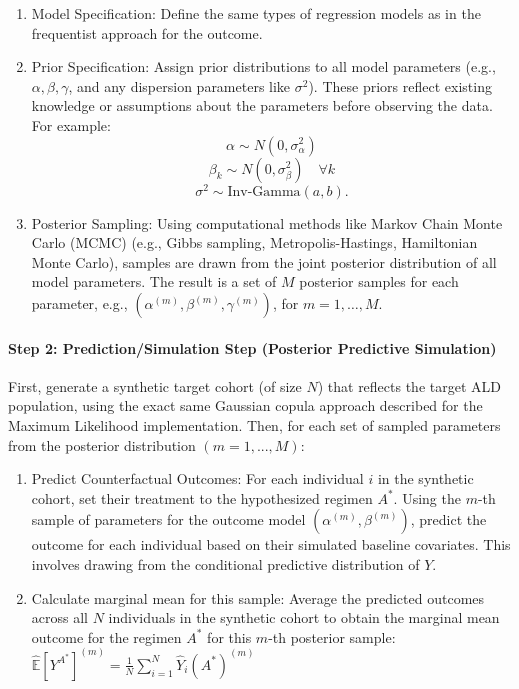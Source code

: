 \documentclass[article]{jss}
\begin{document}
\begin{enumerate}
    \item Model Specification: Define the same types of regression models as in the frequentist approach for the outcome.

    \item Prior Specification: Assign prior distributions to all model parameters (e.g., $\alpha, \beta, \gamma$, and any dispersion parameters like $\sigma^2$). These priors reflect existing knowledge or assumptions about the parameters before observing the data. For example:
    $$ \alpha \sim N(0, \sigma_{\alpha}^2) $$
    $$ \beta_k \sim N(0, \sigma_{\beta}^2) \quad \forall k $$
    $$ \sigma^2 \sim \text{Inv-Gamma}(a, b). $$

    \item Posterior Sampling:
    Using computational methods like Markov Chain Monte Carlo (MCMC) (e.g., Gibbs sampling, Metropolis-Hastings, Hamiltonian Monte Carlo), samples are drawn from the joint posterior distribution of all model parameters. The result is a set of $M$ posterior samples for each parameter, e.g., $(\alpha^{(m)}, \beta^{(m)}, \gamma^{(m)})$, for $m=1, \dots, M$.
\end{enumerate}

\paragraph{Step 2: Prediction/Simulation Step (Posterior Predictive Simulation)}
First, generate a synthetic target cohort (of size $N$) that reflects the target ALD population, using the exact same Gaussian copula approach described for the Maximum Likelihood implementation. Then, for each set of sampled parameters from the posterior distribution $(m=1, ..., M)$:
\begin{enumerate}
    \item Predict Counterfactual Outcomes: For each individual $i$ in the synthetic cohort, set their treatment to the hypothesized regimen $A^*$. Using the $m$-th sample of parameters for the outcome model $(\alpha^{(m)}, \beta^{(m)})$, predict the outcome for each individual based on their simulated baseline covariates. This involves drawing from the conditional predictive distribution of $Y$.
    \item Calculate marginal mean for this sample: Average the predicted outcomes across all $N$ individuals in the synthetic cohort to obtain the marginal mean outcome for the regimen $A^*$ for this $m$-th posterior sample:$\hat{\mathbb{E}}[Y^{A^*}]^{(m)} = \frac{1}{N} \sum_{i=1}^N \hat{Y}_i(A^*)^{(m)}$
\end{enumerate}
\end{document}
